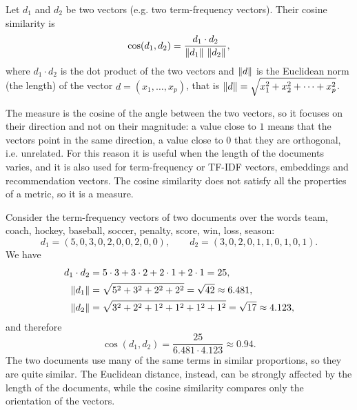 \begin{definition}
Let $d_1$ and $d_2$ be two vectors (e.g. two term-frequency vectors). Their cosine similarity is
\[
    \cos(d_1,d_2)=\frac{d_1\cdot d_2}{\left\lVert d_1 \right\rVert\,\left\lVert d_2 \right\rVert},
\]
where $d_1\cdot d_2$ is the dot product of the two vectors and $\left\lVert d \right\rVert$ is the Euclidean norm (the length) of the vector $d=(x_1,\dots,x_p)$, that is $\left\lVert d \right\rVert=\sqrt{x_1^2+x_2^2+\dots+x_p^2}$.
\end{definition}

The measure is the cosine of the angle between the two vectors, so it focuses on their direction and not on their magnitude: a value close to $1$ means that the vectors point in the same direction, a value close to $0$ that they are orthogonal, i.e. unrelated. For this reason it is useful when the length of the documents varies, and it is also used for term-frequency or TF-IDF vectors, embeddings and recommendation vectors. The cosine similarity does not satisfy all the properties of a metric, so it is a  measure.

\begin{example}
Consider the term-frequency vectors of two documents over the words team, coach, hockey, baseball, soccer, penalty, score, win, loss, season:
\[
    d_1=(5,0,3,0,2,0,0,2,0,0),\qquad d_2=(3,0,2,0,1,1,0,1,0,1).
\]
We have
\begin{align*}
    d_1\cdot d_2 &= 5\cdot 3+3\cdot 2+2\cdot 1+2\cdot 1=25,\\
    \left\lVert d_1 \right\rVert &= \sqrt{5^2+3^2+2^2+2^2}=\sqrt{42}\approx 6.481,\\
    \left\lVert d_2 \right\rVert &= \sqrt{3^2+2^2+1^2+1^2+1^2+1^2}=\sqrt{17}\approx 4.123,
\end{align*}
and therefore
\[
    \cos(d_1,d_2)=\frac{25}{6.481\cdot 4.123}\approx 0.94.
\]
The two documents use many of the same terms in similar proportions, so they are quite similar. The Euclidean distance, instead, can be strongly affected by the length of the documents, while the cosine similarity compares only the orientation of the vectors.
\end{example}

